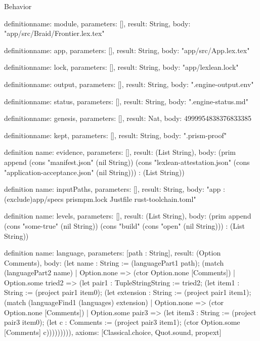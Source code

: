 \begin{lexlean}{Behavior}
\begin{semanticmodule}
definition{name: module, parameters: [], result: String, body: "app/src/Braid/Frontier.lex.tex"}

definition{name: app, parameters: [], result: String, body: "app/src/App.lex.tex"}

definition{name: lock, parameters: [], result: String, body: "app/lexlean.lock"}

definition{name: output, parameters: [], result: String, body: ".engine-output.env"}

definition{name: status, parameters: [], result: String, body: ".engine-status.md"}

definition{name: genesis, parameters: [], result: Nat, body: 4999954838376833385}

definition{name: kept, parameters: [], result: String, body: ".prism-proof"}

definition{
  name: evidence,
  parameters: [],
  result: (List String),
  body: (prim append (cons "manifest.json" (nil String)) (cons "lexlean-attestation.json" (cons "application-acceptance.json" (nil String))) : (List String))
}

definition{
  name: inputPaths,
  parameters: [],
  result: String,
  body: "app :(exclude)app/specs prismpm.lock Justfile rust-toolchain.toml"
}

definition{
  name: levels,
  parameters: [],
  result: (List String),
  body: (prim append (cons "some-true" (nil String)) (cons "build" (cons "open" (nil String))) : (List String))
}

definition{
  name: language,
  parameters: [path : String],
  result: (Option Comments),
  body: (let name : String := (languagePart1 path); (match (languagePart2 name)
    | Option.none => (ctor Option.none [Comments])
    | Option.some tried2 => (let pair1 : TupleStringString := tried2; (let item1 : String := (project pair1 item0); (let extension : String := (project pair1 item1); (match (languageFind1 (languages) extension)
      | Option.none => (ctor Option.none [Comments])
      | Option.some pair3 => (let item3 : String := (project pair3 item0); (let c : Comments := (project pair3 item1); (ctor Option.some [Comments] c))))))))),
  axioms: [Classical.choice, Quot.sound, propext]
}
\end{semanticmodule}
\end{lexlean}
